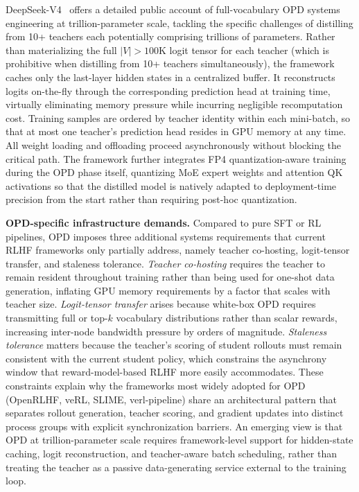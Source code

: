 \documentclass{article} %
\begin{document}
DeepSeek-V4~\citep{deepseekv4} offers a detailed public account of full-vocabulary OPD systems engineering at trillion-parameter scale, tackling the specific challenges of distilling from 10+ teachers each potentially comprising trillions of parameters. Rather than materializing the full $|V| > 100$K logit tensor for each teacher (which is prohibitive when distilling from 10+ teachers simultaneously), the framework caches only the last-layer hidden states in a centralized buffer. It reconstructs logits on-the-fly through the corresponding prediction head at training time, virtually eliminating memory pressure while incurring negligible recomputation cost. Training samples are ordered by teacher identity within each mini-batch, so that at most one teacher's prediction head resides in GPU memory at any time. All weight loading and offloading proceed asynchronously without blocking the critical path. The framework further integrates FP4 quantization-aware training during the OPD phase itself, quantizing MoE expert weights and attention QK activations so that the distilled model is natively adapted to deployment-time precision from the start rather than requiring post-hoc quantization.

\textbf{OPD-specific infrastructure demands.} Compared to pure SFT or RL pipelines, OPD imposes three additional systems requirements that current RLHF frameworks only partially address, namely teacher co-hosting, logit-tensor transfer, and staleness tolerance. \emph{Teacher co-hosting} requires the teacher to remain resident throughout training rather than being used for one-shot data generation, inflating GPU memory requirements by a factor that scales with teacher size. \emph{Logit-tensor transfer} arises because white-box OPD requires transmitting full or top-$k$ vocabulary distributions rather than scalar rewards, increasing inter-node bandwidth pressure by orders of magnitude. \emph{Staleness tolerance} matters because the teacher's scoring of student rollouts must remain consistent with the current student policy, which constrains the asynchrony window that reward-model-based RLHF more easily accommodates. These constraints explain why the frameworks most widely adopted for OPD (OpenRLHF, veRL, SLIME, verl-pipeline) share an architectural pattern that separates rollout generation, teacher scoring, and gradient updates into distinct process groups with explicit synchronization barriers. An emerging view is that OPD at trillion-parameter scale requires framework-level support for hidden-state caching, logit reconstruction, and teacher-aware batch scheduling, rather than treating the teacher as a passive data-generating service external to the training loop.
\end{document}
